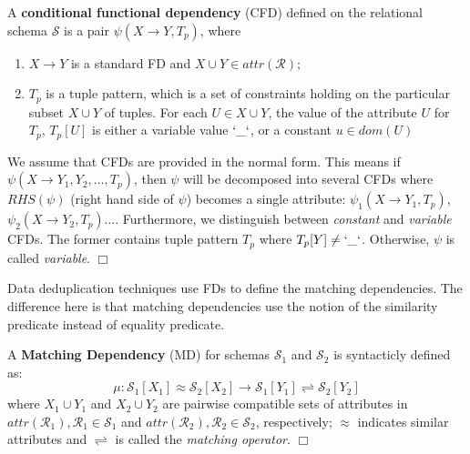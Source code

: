 \vspace{-1em}
\begin{definition}
  A \textbf{conditional functional dependency} (CFD) defined on the relational schema $\mathcal{S}$ 
is a pair $\psi(X \rightarrow Y , T_p)$,  where 
\vspace{-3em}
\begin{enumerate}
    \item $X \rightarrow Y$ is a standard FD and $X \cup Y \in attr(\mathcal{R})$; 
    \item $T_p$ is a tuple pattern, which is a set of constraints holding on the particular subset $X \cup Y$ of tuples. For each $U \in X \cup Y$, the value of the attribute $U$ for $T_p$, $T_p[U]$ is either a variable value $`\_`$, or a constant $u \in dom(U)$
  \end{enumerate} 
We assume that CFDs are provided in the normal form. This means if $\psi(X \rightarrow Y_1,Y_2,\dots , T_p)$, then $\psi$ will be decomposed into several CFDs where $RHS(\psi)$ (right hand side of $\psi$) becomes a single attribute: $\psi_1(X \rightarrow Y_1 , T_p)$, $\psi_2(X \rightarrow Y_2 , T_p) \dots$. Furthermore, we distinguish between \textit{constant} and \textit{variable} CFDs. The former contains tuple pattern $T_p$ where $T_p[Y]\neq `\_`$. Otherwise, $\psi$ is called \textit{variable}.
$\Box$
  \end{definition}
\vspace{-2em}

Data deduplication techniques use FDs to define the matching dependencies. The difference here is that matching dependencies use the
notion of the similarity predicate instead of equality predicate.
\vspace{-1em}
\begin{definition}
  A \textbf{Matching Dependency} (MD) for schemas $\mathcal{S}_1$ and $\mathcal{S}_2$ is syntacticly defined as:
  \begin{equation*}
  \mu: \mathcal{S}_1[X_1]\approx \mathcal{S}_2[X_2]\rightarrow \mathcal{S}_1[Y_1]\rightleftharpoons \mathcal{S}_2[Y_2]   
  \end{equation*}  
  where $X_1 \cup Y_1$ and $X_2 \cup Y_2$ are pairwise compatible sets of attributes in $attr(\mathcal{R}_1), \mathcal{R}_1\in \mathcal{S}_1$ and $attr(\mathcal{R}_2), \mathcal{R}_2\in \mathcal{S}_2$, respectively; $\approx$ indicates
  similar attributes and $\rightleftharpoons$ is called the \textit{matching operator}. $\Box$
\end{definition}
\vspace{-2em}

